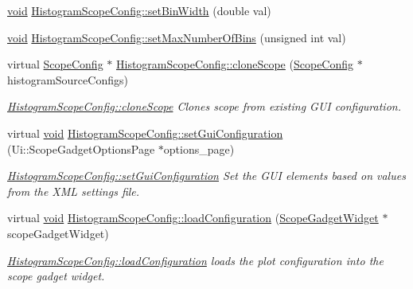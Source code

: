 \begin{DoxyCompactItemize}
\item 
\hyperlink{group___u_a_v_objects_plugin_ga444cf2ff3f0ecbe028adce838d373f5c}{void} \hyperlink{group___scope_plugin_ga692ce41b341567916c0ff62a541b4138}{\-Histogram\-Scope\-Config\-::set\-Bin\-Width} (double val)
\item 
\hyperlink{group___u_a_v_objects_plugin_ga444cf2ff3f0ecbe028adce838d373f5c}{void} \hyperlink{group___scope_plugin_ga9fc3929f75679aa143e96e9919de54ac}{\-Histogram\-Scope\-Config\-::set\-Max\-Number\-Of\-Bins} (unsigned int val)
\item 
virtual \hyperlink{class_scope_config}{\-Scope\-Config} $\ast$ \hyperlink{group___scope_plugin_gaf687cd062ff03c3a6dcf3edb05d29662}{\-Histogram\-Scope\-Config\-::clone\-Scope} (\hyperlink{class_scope_config}{\-Scope\-Config} $\ast$histogram\-Source\-Configs)
\begin{DoxyCompactList}\small\item\em \hyperlink{group___scope_plugin_gaf687cd062ff03c3a6dcf3edb05d29662}{\-Histogram\-Scope\-Config\-::clone\-Scope} \-Clones scope from existing \-G\-U\-I configuration. \end{DoxyCompactList}\item 
virtual \hyperlink{group___u_a_v_objects_plugin_ga444cf2ff3f0ecbe028adce838d373f5c}{void} \hyperlink{group___scope_plugin_ga575b4cb9a8b9a9ad8e236487a3da570b}{\-Histogram\-Scope\-Config\-::set\-Gui\-Configuration} (\-Ui\-::\-Scope\-Gadget\-Options\-Page $\ast$options\-\_\-page)
\begin{DoxyCompactList}\small\item\em \hyperlink{group___scope_plugin_ga575b4cb9a8b9a9ad8e236487a3da570b}{\-Histogram\-Scope\-Config\-::set\-Gui\-Configuration} \-Set the \-G\-U\-I elements based on values from the \-X\-M\-L settings file. \end{DoxyCompactList}\item 
virtual \hyperlink{group___u_a_v_objects_plugin_ga444cf2ff3f0ecbe028adce838d373f5c}{void} \hyperlink{group___scope_plugin_gace592757ce86fefdc0848379d6833748}{\-Histogram\-Scope\-Config\-::load\-Configuration} (\hyperlink{class_scope_gadget_widget}{\-Scope\-Gadget\-Widget} $\ast$scope\-Gadget\-Widget)
\begin{DoxyCompactList}\small\item\em \hyperlink{group___scope_plugin_gace592757ce86fefdc0848379d6833748}{\-Histogram\-Scope\-Config\-::load\-Configuration} loads the plot configuration into the scope gadget widget. \end{DoxyCompactList}\item 

\end{DoxyCompactItemize}
